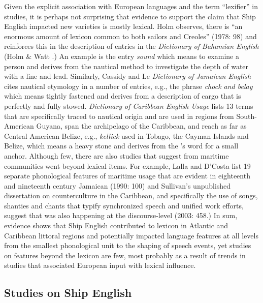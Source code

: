 Given the explicit association with  European languages and the term “lexifier” in  studies, it is perhaps not surprising that evidence to support the claim that Ship English impacted new varieties is mostly lexical. Holm observes, there is “an enormous amount of lexicon common to both sailors and Creoles” (1978: 98) and reinforces this in the description of entries in the \textit{Dictionary of Bahamian English} (Holm \& Watt \citealt{Schilling1982}.) An example is the entry \textit{sound} which means to examine a person and derives from the nautical method to investigate the depth of water with a line and lead. Similarly, Cassidy and Le  \textit{Dictionary of Jamaican English} cites nautical etymology in a number of entries, e.g., the phrase \textit{chock and belay} which means tightly fastened and derives from a description of cargo that is perfectly and fully stowed.  \textit{Dictionary of Caribbean English Usage} lists 13 terms that are specifically traced to nautical origin and are used in regions from South-American Guyana, span the archipelago of the Caribbean, and reach as far as Central American Belize, e.g., \textit{kellick} used in Tobago, the Cayman Islands and Belize, which means a heavy stone and derives from the ’s word for a small anchor. Although few, there are also studies that suggest  from maritime communities went beyond lexical items. For example, Lalla and D’Costa list 19 separate phonological features of maritime usage that are evident in eighteenth and nineteenth century Jamaican  (1990: 100) and Sullivan’s unpublished dissertation on  counterculture in the Caribbean, and specifically the use of songs, shanties and chants that typify synchronized speech and unified work efforts, suggest that  was also happening at the discourse-level (2003: 458.) In sum, evidence shows that Ship English contributed to lexicon in Atlantic and Caribbean littoral regions and potentially impacted language features at all levels from the smallest phonological unit to the shaping of speech events, yet studies on features beyond the lexicon are few, most probably as a result of trends in  studies that associated European input with lexical influence.  

\subsection{{Studies on Ship English}}\label{sec:2.1.2}

